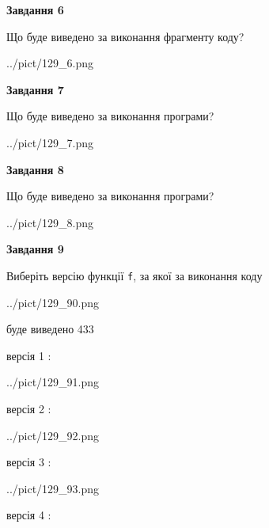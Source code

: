 \documentclass[12pt, ukrainian]{article}
\def\code#1{\Verb!#1!}
\begin{document}
{\begin {large}
{\begin {center}\textbf{Завдання 6}\end {center}}

Що буде виведено за виконання фрагменту коду?\par
\begin{center}
	{../pict/129_6.png}
\end{center}
\newpage

{\begin {center}\textbf{Завдання 7}\end {center}}

Що буде виведено за виконання програми?\par
\begin{center}
	{../pict/129_7.png}
\end{center}
\newpage

{\begin {center}\textbf{Завдання 8}\end {center}}

Що буде виведено за виконання програми?\par
\begin{center}
	{../pict/129_8.png}
\end{center}
\newpage

{\begin {center}\textbf{Завдання 9}\end {center}}

Виберіть версію функції \code{f}, за якої за виконання коду
\begin{center}
	{../pict/129_90.png}
\end{center}
буде виведено 433

\vspace{5mm}
версія 1 :

\begin{center}
	{../pict/129_91.png}
\end{center}
версія 2 :

\begin{center}
	{../pict/129_92.png}
\end{center}
версія 3 :

\begin{center}
	{../pict/129_93.png}
\end{center}
версія 4 :


\end{large}}
\end{document}
